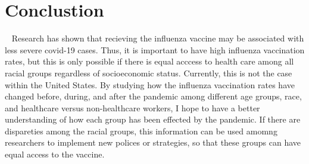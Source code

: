 \documentclass[12pt]{article}
\begin{document}
\section{Conclustion}\
\label{sec:Conclusion}
Research has shown that recieving the influenza vaccine may be associated with less severe covid-19 cases. Thus, it is important to have high influenza vaccination
rates, but this is only possible if there is equal acccess to health care among all racial groups regardless of socioeconomic status. Currently, this is not the case
within the United States. By studying how the influenza vaccination rates have changed before, during, and after the pandemic among different age groups, race, and
healthcare versus non-healthcare workers, I hope to have a better understanding of how each group has been effected by the pandemic. If there are dispareties among the 
racial groups, this information can be used amomng researchers to implement new polices or strategies, so that these groups can have equal access to the vaccine. 



\end{document}
